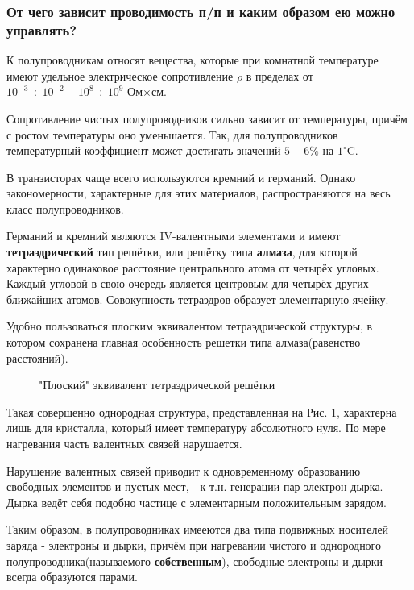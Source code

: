 \subsubsection{От чего зависит проводимость п/п и каким образом ею можно управлять?}

К полупроводникам относят вещества, которые при комнатной температуре имеют удельное электрическое сопротивление $\rho$ в пределах от $10^{-3}\div 10^{-2} - 10^8\div 10^9$ Ом$\times$см.

Сопротивление чистых полупроводников сильно зависит от температуры, причём с ростом температуры оно уменьшается. Так, для полупроводников температурный коэффициент может достигать значений $5-6\%$ на $1^{\circ}$C.

В транзисторах чаще всего используются кремний и германий. Однако закономерности, характерные для этих материалов, распространяются на весь класс полупроводников.

Германий и кремний являются IV-валентными элементами и имеют \textbf{тетраэдрический} тип решётки, или решётку типа \textbf{алмаза}, для которой характерно одинаковое расстояние центрального атома от четырёх угловых. Каждый угловой в свою очередь является центровым для четырёх других ближайших атомов. Совокупность тетраэдров образует элементарную ячейку.

Удобно пользоваться плоским эквивалентом тетраэдрической структуры, в котором сохранена главная особенность решетки типа алмаза(равенство расстояний).

\begin{center}
	\begin{figure}[h!]
		\caption{"Плоский" эквивалент тетраэдрической решётки}	
		\label{2D}
	\end{figure}
\end{center}

Такая совершенно однородная структура, представленная на Рис. \ref{2D}, характерна лишь для кристалла, который имеет температуру абсолютного нуля. По мере нагревания часть валентных связей нарушается.

Нарушение валентных связей приводит к одновременному образованию свободных элементов и пустых мест, - к т.н. генерации пар электрон-дырка. Дырка ведёт себя подобно частице с элементарным положительным зарядом.

Таким образом, в полупроводниках имееются два типа подвижных носителей заряда - электроны и дырки, причём при нагревании чистого и однородного полупроводника(называемого \textbf{собственным}), свободные электроны и дырки всегда образуются парами.


